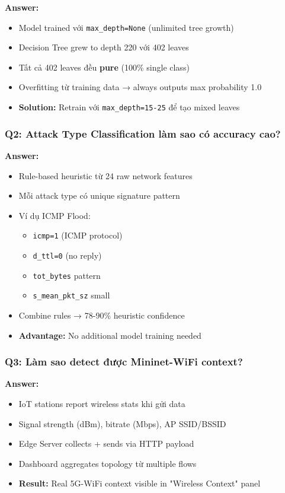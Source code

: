 \documentclass[12pt,a4paper]{article}
\begin{document}
\textbf{Answer:}
\begin{itemize}
    \item Model trained với \texttt{max\_depth=None} (unlimited tree growth)
    \item Decision Tree grew to depth 220 với 402 leaves
    \item Tất cả 402 leaves đều \textbf{pure} (100\% single class)
    \item Overfitting từ training data → always outputs max probability 1.0
    \item \textbf{Solution:} Retrain với \texttt{max\_depth=15-25} để tạo mixed leaves
\end{itemize}

\subsubsection{Q2: Attack Type Classification làm sao có accuracy cao?}

\textbf{Answer:}
\begin{itemize}
    \item Rule-based heuristic từ 24 raw network features
    \item Mỗi attack type có unique signature pattern
    \item Ví dụ ICMP Flood:
    \begin{itemize}
        \item \texttt{icmp=1} (ICMP protocol)
        \item \texttt{d\_ttl=0} (no reply)
        \item \texttt{tot\_bytes} pattern
        \item \texttt{s\_mean\_pkt\_sz} small
    \end{itemize}
    \item Combine rules → 78-90\% heuristic confidence
    \item \textbf{Advantage:} No additional model training needed
\end{itemize}

\subsubsection{Q3: Làm sao detect được Mininet-WiFi context?}

\textbf{Answer:}
\begin{itemize}
    \item IoT stations report wireless stats khi gửi data
    \item Signal strength (dBm), bitrate (Mbps), AP SSID/BSSID
    \item Edge Server collects + sends via HTTP payload
    \item Dashboard aggregates topology từ multiple flows
    \item \textbf{Result:} Real 5G-WiFi context visible in "Wireless Context" panel
\end{itemize}
\end{document}
